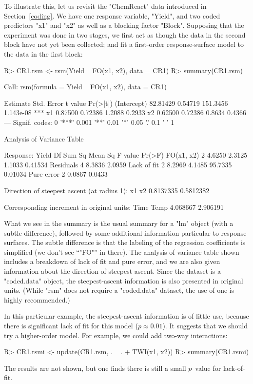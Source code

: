 \documentclass[article,nojss]{jss}
\def\Sect#1{Section~\ref{#1}}
\begin{document}
To illustrate this, let us revisit the "ChemReact" data introduced in \Sect{coding}.  We have one response variable, "Yield", and two coded predictors "x1" and "x2" as well as a blocking factor "Block".  Supposing that the experiment was done in two stages, we first act as though the data in the second block have not yet been collected; and fit a first-order response-surface model to the data in the first block:
\begin{Schunk}
\begin{Sinput}
R> CR1.rsm <- rsm(Yield ~ FO(x1, x2), data = CR1)
R> summary(CR1.rsm)
\end{Sinput}
\begin{Soutput}
Call:
rsm(formula = Yield ~ FO(x1, x2), data = CR1)

            Estimate Std. Error  t value  Pr(>|t|)    
(Intercept) 82.81429    0.54719 151.3456 1.143e-08 ***
x1           0.87500    0.72386   1.2088    0.2933    
x2           0.62500    0.72386   0.8634    0.4366    
---
Signif. codes:  0 '***' 0.001 '**' 0.01 '*' 0.05 '.' 0.1 ' ' 1 

Analysis of Variance Table

Response: Yield
            Df Sum Sq Mean Sq F value  Pr(>F)
FO(x1, x2)   2 4.6250  2.3125  1.1033 0.41534
Residuals    4 8.3836  2.0959                
Lack of fit  2 8.2969  4.1485 95.7335 0.01034
Pure error   2 0.0867  0.0433                

Direction of steepest ascent (at radius 1):
       x1        x2 
0.8137335 0.5812382 

Corresponding increment in original units:
    Time     Temp 
4.068667 2.906191 
\end{Soutput}
\end{Schunk}
What we see in the summary is the usual summary for a "lm" object (with a subtle difference), followed by some additional information particular to response surfaces.  The subtle difference is that the labeling of the regression coefficients is simplified (we don't see ``"FO"'' in there).  The analysis-of-variance table shown includes a breakdown of lack of fit and pure error, and we are also given information about the direction of steepest ascent.  Since the dataset is a "coded.data" object, the steepest-ascent information is also presented in original units.  (While "rsm" does not require a "coded.data" dataset, the use of one is highly recommended.)

In this particular example, the steepest-ascent information is of little use, because there is significant
lack of fit for this model ($p \approx 0.01$).  It suggests that we should try a higher-order model.  For example, we could add two-way interactions:
\begin{Schunk}
\begin{Sinput}
R> CR1.rsmi <- update(CR1.rsm, . ~ . + TWI(x1, x2))
R> summary(CR1.rsmi)
\end{Sinput}
\end{Schunk}
The results are not shown, but one finds there is still a small $p$~value for lack-of-fit.  
\end{document}
